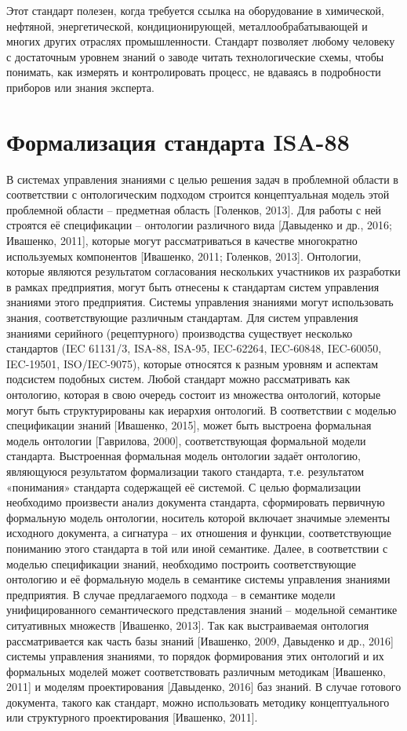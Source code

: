 Этот стандарт полезен, когда требуется ссылка на оборудование в химической, нефтяной, энергетической, кондиционирующей, металлообрабатывающей и многих других отраслях промышленности. Стандарт позволяет любому человеку с достаточным уровнем знаний о заводе читать технологические схемы, чтобы понимать, как измерять и контролировать процесс, не вдаваясь в подробности приборов или знания эксперта.

\section{Формализация стандарта ISA-88}

В системах управления знаниями с целью решения задач в проблемной области в соответствии с онтологическим подходом строится концептуальная модель этой проблемной области – предметная область [Голенков, 2013]. Для работы с ней строятся её спецификации – онтологии различного вида [Давыденко и др., 2016; Ивашенко, 2011], которые могут рассматриваться в качестве многократно используемых компонентов [Ивашенко, 2011; Голенков, 2013]. Онтологии, которые являются результатом согласования нескольких участников их разработки в рамках предприятия, могут быть отнесены к стандартам систем управления знаниями этого предприятия.
Системы управления знаниями могут использовать знания, соответствующие различным стандартам. Для систем управления знаниями серийного (рецептурного) производства существует несколько стандартов (IEC 61131/3, ISA-88, ISA-95, IEC-62264, IEC-60848, IEC-60050, IEC-19501, ISO/IEC-9075), которые относятся к разным уровням и аспектам подсистем подобных систем.
Любой стандарт можно рассматривать как онтологию, которая в свою очередь состоит из множества онтологий, которые могут быть структурированы как иерархия онтологий. В соответствии с моделью спецификации знаний [Ивашенко, 2015], может быть выстроена формальная модель онтологии [Гаврилова, 2000], соответствующая формальной модели стандарта. Выстроенная формальная модель онтологии задаёт онтологию, являющуюся результатом формализации такого стандарта, т.е. результатом «понимания» стандарта содержащей её системой. С целью формализации необходимо произвести анализ документа стандарта, сформировать первичную формальную модель онтологии, носитель которой включает значимые элементы исходного документа, а сигнатура – их отношения и функции, соответствующие пониманию этого стандарта в той или иной семантике. Далее, в соответствии с моделью спецификации знаний, необходимо построить соответствующие онтологию и её формальную модель в семантике системы управления знаниями предприятия. В случае предлагаемого подхода – в семантике модели унифицированного семантического представления знаний – модельной семантике ситуативных множеств [Ивашенко, 2013]. Так как выстраиваемая онтология рассматривается как часть базы знаний [Ивашенко, 2009, Давыденко и др., 2016] системы управления знаниями, то порядок формирования этих онтологий и их формальных моделей может соответствовать различным методикам [Ивашенко, 2011] и моделям проектирования [Давыденко, 2016] баз знаний.
В случае готового документа, такого как стандарт, можно использовать методику концептуального или структурного проектирования [Ивашенко, 2011].

